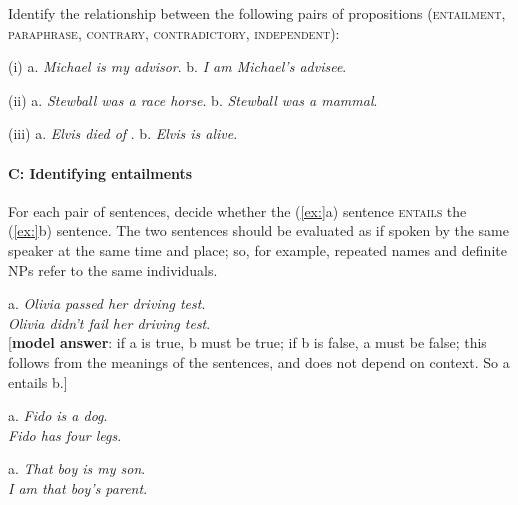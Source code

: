 Identify the relationship between the following pairs of propositions (\textsc{entailment, paraphrase, contrary,} \textsc{contradictory,} \textsc{independent}):

\begin{stylepoints}
(i)  a. \textit{Michael is my advisor}.  b. \textit{I am Michael’s advisee}.
\end{stylepoints}

\begin{stylepoints}
(ii)  a. \textit{Stewball was a race horse}.  b. \textit{Stewball was a mammal}.
\end{stylepoints}

\begin{stylepoints}
(iii)  a. \textit{Elvis died of} .  b. \textit{Elvis is alive}.
\end{stylepoints}

\paragraph*{C: Identifying entailments}

For each pair of sentences, decide whether the (\ref{ex:}a) sentence \textsc{entails} the (\ref{ex:}b) sentence. The two sentences should be evaluated as if spoken by the same speaker at the same time and place; so, for example, repeated names and definite NPs refer to the same individuals.

\begin{stylepoints}
\ea%
    \label{ex:key:1}




          a. \textit{Olivia passed her driving test}.\\
\ex \textit{Olivia didn’t fail her driving test}.\\
{}[\textbf{model answer}: if a is true, b must be true; if b is false, a must be false; this follows from the meanings of the sentences, and does not depend on context. So a entails b.]
    \z
\end{stylepoints}

\begin{stylepoints}
\ea%
    \label{ex:key:2}




          a. \textit{Fido is a dog}.\\
\ex \textit{Fido has four legs}.
    \z
\end{stylepoints}

\begin{stylepoints}
\ea%
    \label{ex:key:3}




          a. \textit{That boy is my son}.\\
\ex \textit{I am that boy’s parent}.
    \z
\end{stylepoints}

